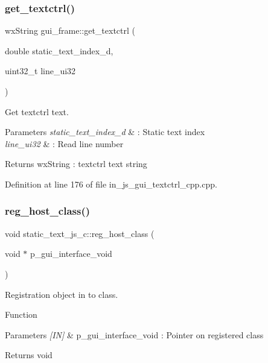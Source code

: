 \subsubsection{get\_textctrl()}
{\footnotesize\ttfamily wx\+String gui\+\_\+frame\+::get\+\_\+textctrl (\begin{DoxyParamCaption}\item[{double}]{static\+\_\+text\+\_\+index\+\_\+d,  }\item[{uint32\+\_\+t}]{line\+\_\+ui32 }\end{DoxyParamCaption})}



Get textctrl text. 


\begin{DoxyParams}{Parameters}
{\em static\+\_\+text\+\_\+index\+\_\+d} & \+: Static text index \\
\hline
{\em line\+\_\+ui32} & \+: Read line number \\
\hline
\end{DoxyParams}
\begin{DoxyReturn}{Returns}
wx\+String \+: textctrl text string 
\end{DoxyReturn}


Definition at line 176 of file in\+\_\+js\+\_\+gui\+\_\+textctrl\+\_\+cpp.\+cpp.

\mbox{\label{group___static__text_ga54524351538337edd54ece1c2f6d0620}} 
\subsubsection{reg\_host\_class()}
{\footnotesize\ttfamily void static\+\_\+text\+\_\+js\+\_\+c\+::reg\+\_\+host\+\_\+class (\begin{DoxyParamCaption}\item[{void $\ast$}]{p\+\_\+gui\+\_\+interface\+\_\+void }\end{DoxyParamCaption})}



Registration object in to class. 

Function
\begin{DoxyParams}{Parameters}
{\em \mbox{[}\+I\+N\mbox{]}} & p\+\_\+gui\+\_\+interface\+\_\+void \+: Pointer on registered class \\
\hline
\end{DoxyParams}
\begin{DoxyReturn}{Returns}
void 
\end{DoxyReturn}



